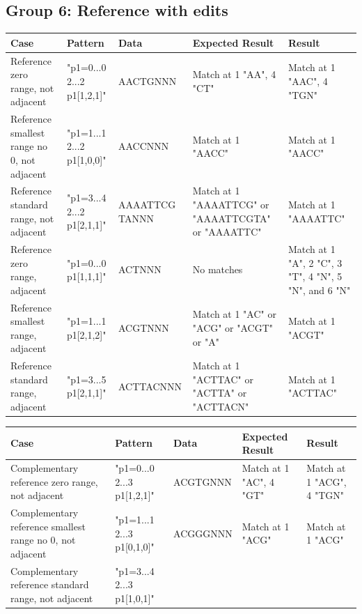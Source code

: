 \documentclass[12pt]{article}
\newcommand{\textapprox}{\raisebox{0.5ex}{\texttildelow}}
\begin{document}
\begin{appendices}
\subsection{Group 6: Reference with edits}
\begin{table}[H]
\begin{tabular}{p{4cm}|p{3cm}|p{2.5cm}|p{2.5cm}|p{2.5cm}}
Case 			& Pattern & Data & Expected Result & Result \\ \hline
\rowcolor{lightred}
Reference zero range, not adjacent & "p1=0...0 2...2 p1[1,2,1]" & AACTGNNN & Match at 1 "AA", 4 "CT" & 
Match at 1 "AAC", 4 "TGN" \\ \hline
\rowcolor{lightgreen}
Reference smallest range no 0, not adjacent & "p1=1...1 2...2 p1[1,0,0]" & AACCNNN & Match at 1 "AACC" & 
Match at 1 "AACC" \\ \hline
\rowcolor{lightgreen}
Reference standard range, not adjacent & "p1=3...4 2...2 p1[2,1,1]" & AAAATTCG TANNN & 
Match at 1 "AAAATTCG" or "AAAATTCGTA" or "AAAATTC" & Match at 1 "AAAATTC"\\ \hline
\rowcolor{lightred}
Reference zero range, adjacent & "p1=0...0 p1[1,1,1]" & ACTNNN & No matches & 
Match at 1 "A", 2 "C", 3 "T", 4 "N", 5 "N", and 6 "N" \\ \hline
\rowcolor{lightgreen}
Reference smallest range, adjacent & "p1=1...1 p1[2,1,2]" & ACGTNNN & 
Match at 1 "AC" or "ACG" or "ACGT" or "A" & Match at 1 "ACGT" \\ \hline
\rowcolor{lightgreen}
Reference standard range, adjacent & "p1=3...5 p1[2,1,1]" & ACTTACNNN & 
Match at 1 "ACTTAC" or "ACTTA" or "ACTTACN" & Match at 1 "ACTTAC" \\ \hline
\end{tabular}
\end{table}
\begin{table}[H]
\begin{tabular}{p{4cm}|p{3cm}|p{2.5cm}|p{2.5cm}|p{2.5cm}}
Case 			& Pattern & Data & Expected Result & Result \\ \hline
\rowcolor{lightred}
Complementary reference zero range, not adjacent & "p1=0...0 2...3 \textapprox p1[1,2,1]" & ACGTGNNN & 
Match at 1 "AC", 4 "GT" & Match at 1 "ACG", 4 "TGN" \\ \hline
\rowcolor{lightgreen}
Complementary reference smallest range no 0, not adjacent & "p1=1...1 2...3 \textapprox p1[0,1,0]" & 
ACGGGNNN & Match at 1 "ACG" & Match at 1 "ACG" \\ \hline
\rowcolor{lightgreen}
Complementary reference standard range, not adjacent& "p1=3...4 2...3 \textapprox p1[1,0,1]" &

\end{tabular}
\end{table}
\end{appendices}
\end{document}

